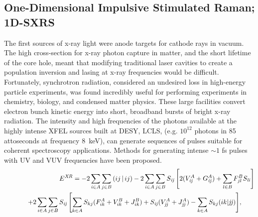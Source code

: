 \documentclass{ar-1col}
\begin{document}
\begin{marginnote}[140pt]
\end{marginnote}

\subsection{One-Dimensional Impulsive Stimulated Raman; 1D-SXRS}
The first sources of x-ray light were anode targets for cathode rays
in vacuum.\cite{roentgen_new_1896} The high cross-section for x-ray
photon capture in matter, and the short lifetime of the core hole,
meant that modifying traditional laser cavities to create a population
inversion and lasing at x-ray frequencies would be
difficult.\cite{duguay_approaches_1967} Fortunately, synchrotron
radiation, considered an undesired loss in high-energy particle
experiments, was found incredibly useful for performing experiments in
chemistry, biology, and condensed matter
physics.\cite{perlman_synchrotron_1974} These large facilities convert
electron bunch kinetic energy into short, broadband bursts of bright
x-ray radiation.\cite{duke_synchrotron_2009} The intensity and high
frequencies of the photons available at the highly intense XFEL
sources built at DESY, LCLS,\cite{emmap._first_2010}
(e.g. $10^{12}$ photons in 85 attoseconds at frequency 8~keV),\cite{emmap._first_2010}
can generate sequences of pulses suitable for coherent spectroscopy applications.\cite{nugent_coherent_2010} Methods for generating intense $\sim1$ fs pulses with
UV and VUV frequencies have been proposed.\cite{reiter_route_2010}
\begin{eqnarray}
&&E^{\it XR}  =  - 2\sum_{i \in A} {\sum_{j \in B} {( {ij\,{\mid}\, {ij} )} } }  - 2\sum_{i \in A} {\sum_{j \in B} {S_{\it ij} \left[ {2( {V_{\it ij}^A  + G_{\it ij}^A } ) + \sum_{l \in B} {F_{jl}^B S_{\it li} } } \right]} }  \nonumber\\
&&\hspace*{26pt}+ 2\sum_{i \in A} {\sum_{j \in B} {S_{\it ij} \left[ {\sum_{k \in A} {S_{kj} ( {F_{ik}^A  + V_{ik}^B  + {J}_{ik}^B } )}  + S_{\it ij} ( {V_{\it jj}^A  + {J}_{\it jj}^A } ) - \sum_{k \in A} {S_{kj} ( {ik| {\it jj} )} } } \right]} } ,\qquad 
\end{eqnarray}
\end{document}
